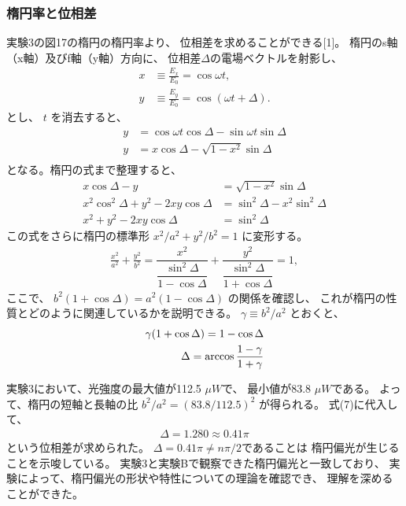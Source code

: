 \documentclass{article}
\begin{document}
\subsubsection*{楕円率と位相差}
\begin{spacing}{1.2}
    実験3の図17の楕円の楕円率より、
    位相差を求めることができる[1]。
    楕円のs軸（x軸）及びf軸（y軸）方向に、
    位相差$\Delta$の電場ベクトルを射影し、
    \begin{align*}
        x &\equiv \frac{E_x}{E_0} = \cos \omega t, \\
        y &\equiv \frac{E_y}{E_0} = \cos(\omega t + \Delta).
    \end{align*}
    とし、 $t$ を消去すると、
    \begin{align*}
        y &= \cos \omega t \cos \Delta - \sin \omega t \sin \Delta \\
        y &= x \cos \Delta - \sqrt{1 - x^2} \sin \Delta \\
    \end{align*}
    となる。楕円の式まで整理すると、
    \begin{align*}
        x \cos \Delta - y &= \sqrt{1 - x^2} \sin \Delta \\
        x^2 \cos^2 \Delta + y^2 - 2xy \cos \Delta &= \sin^2 \Delta - x^2 \sin^2 \Delta \\
        x^2 + y^2 - 2xy \cos \Delta &= \sin^2 \Delta
    \end{align*}
    この式をさらに楕円の標準形 $x^2/a^2 + y^2/b^2 = 1$ に変形する。
    \begin{align*}
    \frac{x^2}{a^2} + \frac{y^2}{b^2} = \dfrac{x^2}{\dfrac{\sin^2\Delta}{1 - \cos\Delta}} + \dfrac{y^2}{\dfrac{\sin^2\Delta}{1 + \cos\Delta}} = 1,
    \end{align*}
    ここで、
    $b^2 (1 + \cos\Delta) = a^2 (1 - \cos\Delta)$ 
    の関係を確認し、
    これが楕円の性質とどのように関連しているかを説明できる。
    $\gamma \equiv b^2/a^2$ とおくと、
    \begin{align}
        \gamma (1 + \cos\Delta) = 1 - \cos\Delta \notag \\
        \Delta = \arccos \dfrac{1 - \gamma}{1 + \gamma}
    \end{align}

    実験3において、光強度の最大値が112.5 $\mu W$で、
    最小値が83.8 $\mu W$である。
    よって、楕円の短軸と長軸の比 
    $b^2 / a^2 = (83.8 / 112.5)^2$ が得られる。
    式(7)に代入して、
    \begin{align*}
        \Delta = 1.280 \approx 0.41 \pi
    \end{align*}
    という位相差が求められた。
    $\Delta = 0.41 \pi \not= n\pi/2$であることは
    楕円偏光が生じることを示唆している。
    実験3と実験Bで観察できた楕円偏光と一致しており、
    実験によって、楕円偏光の形状や特性についての理論を確認でき、
    理解を深めることができた。
\end{spacing}
\end{document}
